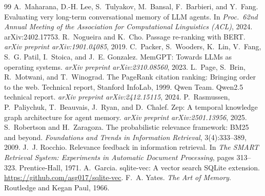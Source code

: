 \documentclass[11pt]{article}
\begin{document}
\begin{thebibliography}{99}
 A.~Maharana, D.-H. Lee, S.~Tulyakov, M.~Bansal, F.~Barbieri, and Y.~Fang. Evaluating very long-term conversational memory of LLM agents. In \emph{Proc.\ 62nd Annual Meeting of the Association for Computational Linguistics (ACL)}, 2024. arXiv:2402.17753.
 R.~Nogueira and K.~Cho. Passage re-ranking with BERT. \emph{arXiv preprint arXiv:1901.04085}, 2019.
 C.~Packer, S.~Wooders, K.~Lin, V.~Fang, S.~G. Patil, I.~Stoica, and J.~E. Gonzalez. MemGPT: Towards LLMs as operating systems. \emph{arXiv preprint arXiv:2310.08560}, 2023.
 L.~Page, S.~Brin, R.~Motwani, and T.~Winograd. The PageRank citation ranking: Bringing order to the web. Technical report, Stanford InfoLab, 1999.
 Qwen Team. Qwen2.5 technical report. \emph{arXiv preprint arXiv:2412.15115}, 2024.
 P.~Rasmussen, P.~Paliychuk, T.~Beauvais, J.~Ryan, and D.~Chalef. Zep: A temporal knowledge graph architecture for agent memory. \emph{arXiv preprint arXiv:2501.13956}, 2025.
 S.~Robertson and H.~Zaragoza. The probabilistic relevance framework: BM25 and beyond. \emph{Foundations and Trends in Information Retrieval}, 3(4):333--389, 2009.
 J.~J. Rocchio. Relevance feedback in information retrieval. In \emph{The SMART Retrieval System: Experiments in Automatic Document Processing}, pages 313--323. Prentice-Hall, 1971.
 A.~Garcia. sqlite-vec: A vector search SQLite extension. \url{https://github.com/asg017/sqlite-vec}.
 F.~A. Yates. \emph{The Art of Memory}. Routledge and Kegan Paul, 1966.
\end{thebibliography}
\end{document}
